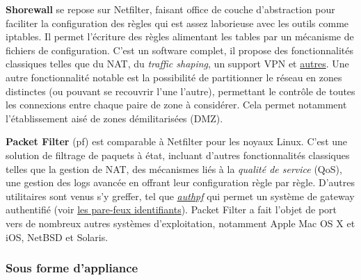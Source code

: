 \documentclass[]{article}
\newcommand{\minit}[1]{\noindent{\small\textbf{ \underline{#1}}}\vspace{0.2cm}}
\begin{document}
\par \textbf{Shorewall} se repose sur Netfilter, faisant office de couche d'abstraction pour faciliter la configuration des règles qui est assez laborieuse avec les outils comme iptables. Il permet l'écriture des règles alimentant les tables par un mécanisme de fichiers de configuration. C'est un software complet, il propose des fonctionnalités classiques telles que du NAT, du \textit{traffic shaping}, un support VPN et \href{http://www.shorewall.net/shorewall_features.htm}{autres}. Une autre fonctionnalité notable est la possibilité de partitionner le réseau en zones distinctes (ou pouvant se recouvrir l'une l'autre), permettant le contrôle de toutes les connexions entre chaque paire de zone à considérer. Cela permet notamment l'établissement aisé de zones démilitarisées (DMZ).\\ 

\minit{BSD}  

\par \textbf{Packet Filter} (pf) est comparable à Netfilter pour les noyaux Linux. C'est une solution de filtrage de paquets à état, incluant d'autres fonctionnalités classiques telles que la gestion de NAT, des mécanismes liés à la \textit{qualité de service} (QoS), une gestion des logs avancée en offrant leur configuration règle par règle. D'autres utilitaires sont venus s'y greffer, tel que \href{https://www.openbsd.org/faq/pf/authpf.html}{\textit{authpf}} qui permet un système de gateway authentifié (voir \hyperref[idfw]{les pare-feux identifiants}). Packet Filter a fait l'objet de port vers de nombreux autres systèmes d'exploitation, notamment Apple Mac OS X et iOS, NetBSD et Solaris.

\newpage

\subsubsection{Sous forme d'appliance}
\end{document}
